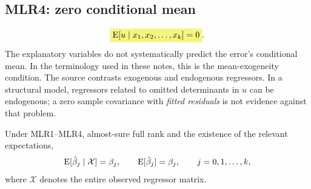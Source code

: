 \subsection{MLR4: zero conditional mean}
\[\hm{\E[u\mid x_1,x_2,\ldots,x_k]=0}.\]
The explanatory variables do not systematically predict the error's conditional mean. In the terminology used in these notes, this is the mean-exogeneity condition. 
The source contrasts exogenous and endogenous regressors. In a structural model, regressors related to omitted determinants in $u$ can be endogenous; a zero sample covariance with \emph{fitted residuals} is not evidence against that problem.

\begin{theorem}\label{thm:multiple-unbiased}
Under MLR1--MLR4, almost-sure full rank and the existence of the relevant expectations,
\[\operatorname{E}[\hat\beta_j\mid\mathcal X]=\beta_j,
\qquad\operatorname{E}[\hat\beta_j]=\beta_j,\qquad j=0,1,\ldots,k,\]
where $\mathcal X$ denotes the entire observed regressor matrix.
\end{theorem}

